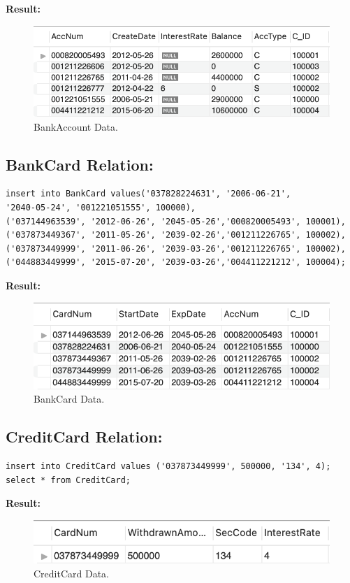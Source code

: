 \documentclass[12pt,a4paper]{article}
\begin{document}
\textbf{Result:}
\begin{figure}[H]
    \centering
    \includegraphics[]{Picture/BankAccountData.png}
    \caption{BankAccount Data.}
\end{figure}

\subsection{BankCard Relation:}
\begin{verbatim}
insert into BankCard values('037828224631', '2006-06-21',
'2040-05-24', '001221051555', 100000), 
('037144963539', '2012-06-26', '2045-05-26','000820005493', 100001), 
('037873449367', '2011-05-26', '2039-02-26','001211226765', 100002),
('037873449999', '2011-06-26', '2039-03-26','001211226765', 100002),
('044883449999', '2015-07-20', '2039-03-26','004411221212', 100004);
\end{verbatim}

\textbf{Result:}
\begin{figure}[H]
    \centering
    \includegraphics[scale = 1]{Picture/BankCardData.png}
    \caption{BankCard Data.}
\end{figure}

\subsection{CreditCard Relation:}
\begin{verbatim}
insert into CreditCard values ('037873449999', 500000, '134', 4);
select * from CreditCard;
\end{verbatim}

\textbf{Result:}
\begin{figure}[H]
    \centering
    \includegraphics[scale = 1]{Picture/CreditCardData.png}
    \caption{CreditCard Data.}
\end{figure}
\end{document}
